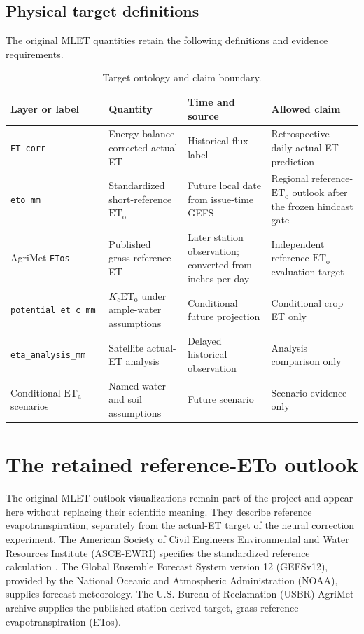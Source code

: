 \documentclass[10pt,letterpaper]{article}
\newcommand{\eto}{\mathrm{ET}_{\mathrm{o}}}
\newcommand{\etaactual}{\mathrm{ET}_{\mathrm{a}}}
\newcommand{\code}[1]{\texttt{#1}}
\begin{document}
\subsection{Physical target definitions}
The original MLET quantities retain the following definitions and evidence requirements.
\begin{table}[ht]

\centering
\caption{Target ontology and claim boundary.}
\label{tab:ontology}
\small
\begin{tabularx}{0.98\textwidth}{>{\raggedright\arraybackslash}p{}
  >{\raggedright\arraybackslash}p{}
  >{\raggedright\arraybackslash}p{}
  >{\raggedright\arraybackslash}X}
\toprule
Layer or label & Quantity & Time and source & Allowed claim \\
\midrule
\code{ET\_corr} & Energy-balance-corrected actual ET & Historical flux label & Retrospective daily actual-ET prediction \\
\code{eto\_mm} & Standardized short-reference $\eto$ & Future local date from issue-time GEFS & Regional reference-$\eto$ outlook after the frozen hindcast gate \\
AgriMet \code{ETos} & Published grass-reference ET & Later station observation; converted from inches per day & Independent reference-$\eto$ evaluation target \\
\code{potential\_et\_c\_mm} & $K_c\eto$ under ample-water assumptions & Conditional future projection & Conditional crop ET only \\
\code{eta\_analysis\_mm} & Satellite actual-ET analysis & Delayed historical observation & Analysis comparison only \\
Conditional $\etaactual$ scenarios & Named water and soil assumptions & Future scenario & Scenario evidence only \\
\bottomrule
\end{tabularx}
\end{table}

\clearpage
\section{The retained reference-ETo outlook}\label{app:outlook}
The original MLET outlook visualizations remain part of the project and appear here without replacing their scientific meaning.
They describe reference evapotranspiration, separately from the actual-ET target of the neural correction experiment.
The American Society of Civil Engineers Environmental and Water Resources Institute (ASCE-EWRI) specifies the standardized reference calculation \citep{asce2005}.
The Global Ensemble Forecast System version 12 (GEFSv12), provided by the National Oceanic and Atmospheric Administration (NOAA), supplies forecast meteorology.
The U.S. Bureau of Reclamation (USBR) AgriMet archive supplies the published station-derived target, grass-reference evapotranspiration (ETos).
\end{document}

